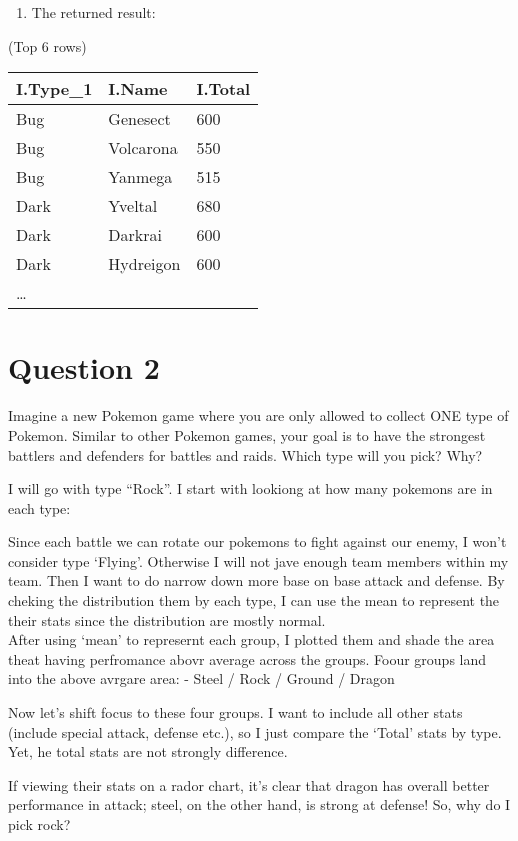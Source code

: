 \documentclass[11pt]{article}
\providecommand{\tightlist}{%
      \setlength{\itemsep}{0pt}\setlength{\parskip}{0pt}}
\begin{document}
\begin{enumerate}
\def\labelenumi{\arabic{enumi}.}
\setcounter{enumi}{2}
\tightlist
\item
  The returned result:
\end{enumerate}

(Top 6 rows)

\begin{longtable}[]{@{}lll@{}}
\toprule
I.Type\_1 & I.Name & I.Total\tabularnewline
\midrule
\endhead
Bug & Genesect & 600\tabularnewline
Bug & Volcarona & 550\tabularnewline
Bug & Yanmega & 515\tabularnewline
Dark & Yveltal & 680\tabularnewline
Dark & Darkrai & 600\tabularnewline
Dark & Hydreigon & 600\tabularnewline
\ldots{} &\tabularnewline
\bottomrule
\end{longtable}

    \hypertarget{question-2}{%
\section{Question 2}\label{question-2}}

Imagine a new Pokemon game where you are only allowed to collect ONE
type of Pokemon. Similar to other Pokemon games, your goal is to have
the strongest battlers and defenders for battles and raids. Which type
will you pick? Why?

I will go with type ``Rock''. I start with lookiong at how many pokemons
are in each type:

Since each battle we can rotate our pokemons to fight against our enemy,
I won't consider type `Flying'. Otherwise I will not jave enough team
members within my team. Then I want to do narrow down more base on base
attack and defense. By cheking the distribution them by each type, I can
use the mean to represent the their stats since the distribution are
mostly normal.\\

After using `mean' to represernt each group, I plotted them and shade
the area theat having perfromance abovr average across the groups. Foour
groups land into the above avrgare area: - Steel / Rock / Ground /
Dragon

Now let's shift focus to these four groups. I want to include all other
stats (include special attack, defense etc.), so I just compare the
`Total' stats by type. Yet, he total stats are not strongly difference.

If viewing their stats on a rador chart, it's clear that dragon has
overall better performance in attack; steel, on the other hand, is
strong at defense! So, why do I pick rock?
\end{document}

